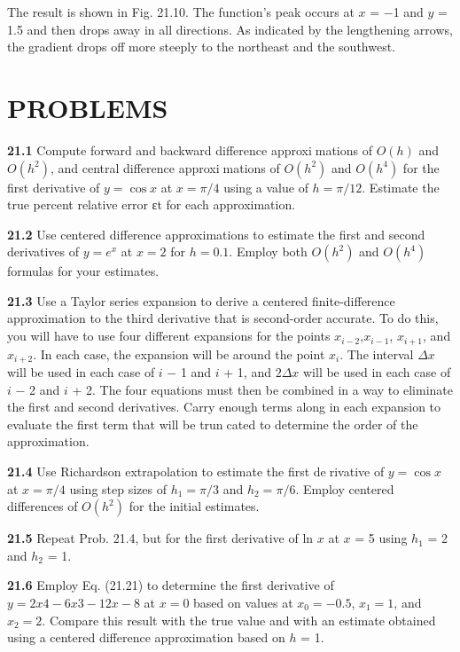 The result is shown in Fig. 21.10. The function’s peak occurs at $x$ = −1 and $y$ = 1.5
and then drops away in all directions. As indicated by the lengthening arrows, the gradient
drops off more steeply to the northeast and the southwest.

\section*{PROBLEMS} \hline

\begin{multicols}{2}
\textbf{21.1} Compute forward and backward difference approximations of $O(h)$ and $O(h^{2})$, and central difference approximations of $O(h^{2})$ and $O(h^{4})$ for the first derivative of
$y = \cos x$ at $x = \pi/4$ using a value of $h = \pi/12$. Estimate
the true percent relative error εt for each approximation. 

\textbf{21.2} Use centered difference approximations to estimate the
first and second derivatives of $y = e^{x}$ at $x = 2$ for $h = 0.1$.
Employ both $O(h^{2})$ and $O(h^{4})$ formulas for your estimates.

\textbf{21.3} Use a Taylor series expansion to derive a centered
finite-difference approximation to the third derivative that is
second-order accurate. To do this, you will have to use four
different expansions for the points $x_{i-2}$,$x_{i-1}$, $x_{i+1}$, and $x_{i+2}$. In each case, the expansion will be around the point $x_{i}$.  The
interval $\Delta x$ will be used in each case of $i$ − 1 and $i$ + 1, and $2\Delta x$ will be used in each case of $i$ − 2 and $i$ + 2. The four
equations must then be combined in a way to eliminate the
first and second derivatives. Carry enough terms along in
each expansion to evaluate the first term that will be truncated to determine the order of the approximation. 

\textbf{21.4} Use Richardson extrapolation to estimate the first derivative of $y = \cos x$ at $x = \pi/4$ using step sizes of $h_{1} = \pi/3$ and $h_{2} = \pi/6$. Employ centered differences of $O(h^{2})$ for the
initial estimates.

\textbf{21.5} Repeat Prob. 21.4, but for the first derivative of ln $x$ at
$x$ = 5 using $h_{1}$ = 2 and $h_{2}$ = 1.

\textbf{21.6} Employ Eq. (21.21) to determine the first derivative 
of $y = 2x4 − 6x3 − 12x − 8$ at $x = 0$ based on values at $x_{0} = - 0.5$, $x_{1} = 1$, and $x_{2} = 2$. Compare this result with
the true value and with an estimate obtained using a centered
difference approximation based on $h$ = 1.


\end{multicols}
